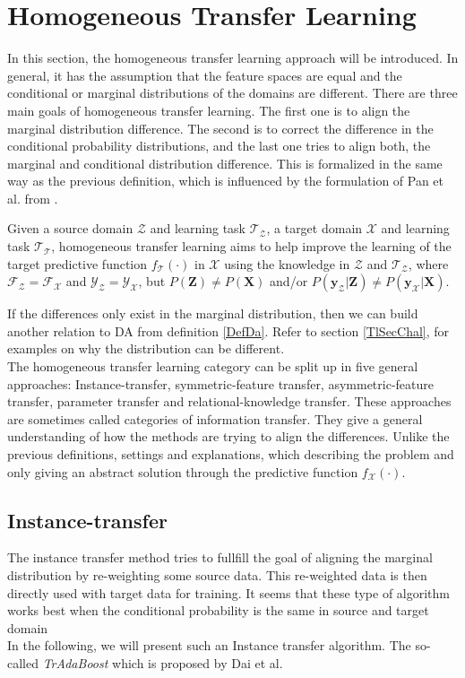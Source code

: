 \section{Homogeneous Transfer Learning}\label{TlSecHomo}
In this section, the homogeneous transfer learning approach will be introduced.
In general, it has the assumption that the feature spaces are equal and the conditional or marginal distributions of the domains are different.
There are three main goals of homogeneous transfer learning.
The first one is to align the marginal distribution difference.
The second is to correct the difference in the conditional probability distributions, and the last one tries to align both, the marginal and conditional distribution difference.\cite[p. 6]{Weiss.2016}
This is formalized in the same way as the previous definition, which is influenced by the formulation of Pan et al. from \cite{Pan.2010}.
\begin{mDef}\label{DefHomogeneous}
	Given a source domain $\mathcal{Z}$ and learning task $\mathcal{T_Z}$, a target domain $\mathcal{X}$ and learning task $\mathcal{T_T}$, homogeneous transfer learning aims to help improve the learning of the target predictive function $f_\mathcal{T}(\cdot)$ in $\mathcal{X}$ using the knowledge in $\mathcal{Z}$ and $\mathcal{T_Z}$, where $\mathcal{F_Z} = \mathcal{F_X}$ and $\mathcal{Y_Z} =\mathcal{Y_X} $, but $P(\mathbf{Z}) \neq P(\mathbf{X})$ and/or $P(\mathbf{y_\mathcal{Z}}\vert \mathbf{Z}) \neq P(\mathbf{y_\mathcal{X}}\vert \mathbf{X})$.\cite[p. 4]{Weiss.2016}
\end{mDef}
If the differences only exist in the marginal distribution, then we can build another relation to \acl{DA} from definition \ref{DefDa}.
Refer to section \ref{TlSecChal}, for examples on why the distribution can be different.\cite[p. 6-7]{Weiss.2016}\\ 
The homogeneous transfer learning category can be split up in five general approaches:
Instance-transfer, symmetric-feature transfer, asymmetric-feature transfer, parameter transfer and relational-knowledge transfer.
These approaches are sometimes called categories of information transfer.
They give a general understanding of how the methods are trying to align the differences.\cite[p. 6-7]{Weiss.2016}
Unlike the previous definitions, settings and explanations, which describing the problem and only giving an abstract solution through the predictive function $f_\mathcal{X}(\cdot)$.
\subsection{Instance-transfer}\label{TlSubSecInstance}
The instance transfer method tries to fullfill the goal of aligning the marginal distribution by re-weighting some source data.
This re-weighted data is then directly used with target data for training.
It seems that these type of algorithm works best when the conditional probability is the same in source and target domain \cite[p. 6]{Weiss.2016}\\
In the following, we will present such an Instance transfer algorithm.
The so-called \textit{TrAdaBoost} which is proposed by Dai et al.\cite{Pan.2010}\\
